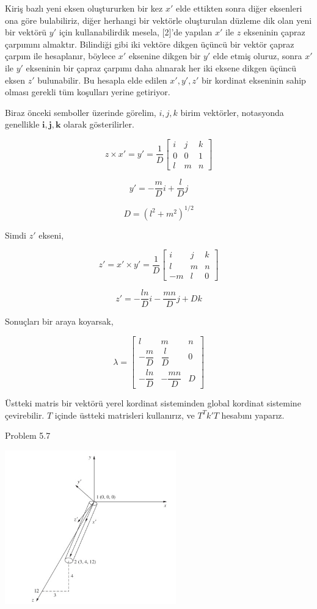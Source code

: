 \documentclass[12pt,fleqn]{article}\usepackage{../../common}
\begin{document}
Kiriş bazlı yeni eksen oluştururken bir kez $x'$ elde ettikten sonra diğer
eksenleri ona göre bulabiliriz, diğer herhangi bir vektörle oluşturulan düzleme
dik olan yeni bir vektörü $y'$ için kullanabilirdik mesela, [2]'de yapılan $x'$
ile $z$ ekseninin çapraz çarpımını almaktır. Bilindiği gibi iki vektöre dikgen
üçüncü bir vektör çapraz çarpım ile hesaplanır, böylece $x'$ eksenine dikgen bir
$y'$ elde etmiş oluruz, sonra $x'$ ile $y'$ ekseninin bir çapraz çarpımı daha
alınarak her iki eksene dikgen üçüncü eksen $z'$ bulunabilir.  Bu hesapla elde
edilen $x',y',z'$ bir kordinat ekseninin sahip olması gerekli tüm koşulları
yerine getiriyor.

Biraz önceki semboller üzerinde görelim, $i,j,k$ birim vektörler, notasyonda
genellikle $\mathbf{i},\mathbf{j},\mathbf{k}$ olarak gösterilirler.

$$
z \times x' = y' = \frac{1}{D}
\left[\begin{array}{ccc}
i & j & k \\ 0 & 0 & 1 \\ l & m & n
\end{array}\right]
$$

$$
y' = - \frac{m}{D} i + \frac{l}{D} j
$$

$$
D = (l^2 + m^2)^{1/2}
$$

Simdi $z'$ ekseni,

$$
z' = x' \times y' = \frac{1}{D}
\left[\begin{array}{ccc}
i & j & k \\ l & m & n \\ -m & l & 0
\end{array}\right]
$$

$$
z' = -\frac{ln}{D} i - \frac{mn}{D} j + D k 
$$

Sonuçları bir araya koyarsak,

$$
\renewcommand*{\arraystretch}{2.0}
\lambda = \left[\begin{array}{ccc}
l & m & n \\
-\dfrac{m}{D} & \dfrac{l}{D} & 0 \\
-\dfrac{ln}{D} & -\dfrac{mn}{D} & D
\end{array}\right]
$$

Üstteki matris bir vektörü yerel kordinat sisteminden global kordinat sistemine
çevirebilir. $T$ içinde üstteki matrisleri kullanırız, ve $T^T k' T$ hesabını
yaparız.

Problem 5.7

\includegraphics[width=20em]{phy_020_strs_11_05.jpg}
\end{document}
